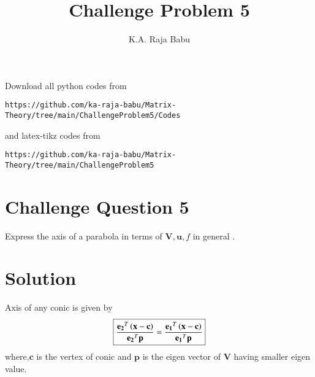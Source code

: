 \documentclass[journal,12pt,twocolumn]{IEEEtran}
\begin{document}
\makeatother
\let\StandardTheFigure\thefigure
\let\vec\mathbf
\renewcommand{\thefigure}{\theproblem}
\def\putbox#1#2#3{\makebox[0in][l]{\makebox[#1][l]{}\raisebox{\baselineskip}[0in][0in]{\raisebox{#2}[0in][0in]{#3}}}}
     \def\rightbox#1{\makebox[0in][r]{#1}}
     \def\centbox#1{\makebox[0in]{#1}}
     \def\topbox#1{\raisebox{-\baselineskip}[0in][0in]{#1}}
     \def\midbox#1{\raisebox{-0.5\baselineskip}[0in][0in]{#1}}
\vspace{3cm}
\title{Challenge Problem 5}
\author{K.A. Raja Babu}
\maketitle
\newpage
\bigskip
\renewcommand{\thefigure}{\theenumi}
\renewcommand{\thetable}{\theenumi}
Download all python codes from 
\begin{lstlisting}
https://github.com/ka-raja-babu/Matrix-Theory/tree/main/ChallengeProblem5/Codes
\end{lstlisting}
%
and latex-tikz codes from 
%
\begin{lstlisting}
https://github.com/ka-raja-babu/Matrix-Theory/tree/main/ChallengeProblem5
\end{lstlisting}
%
\section{Challenge Question 5}

Express the axis of a parabola in terms of $\vec{V},\vec{u},f$ in general .

\section{Solution}

\begin{lemma}
Axis of any conic is given by
\begin{align}
    \boxed{\frac{\vec{e_2}^T\brak{\vec{x}-\vec{c}}}{{\vec{e_2}^T\vec{p}}} = \frac{\vec{e_1}^T\brak{\vec{x}-\vec{c}}}{{\vec{e_1}^T\vec{p}}}}
\end{align}
where,$\vec{c}$ is the vertex of conic and $\vec{p}$ is the eigen vector of $\vec{V}$ having smaller eigen value.
\end{lemma}
\end{document}
